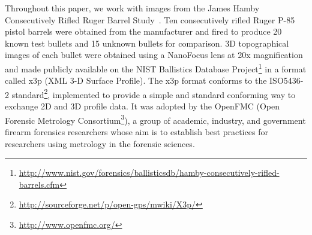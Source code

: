 \documentclass[aoas, preprint]{imsart}\usepackage[]{graphicx}\usepackage[]{color}
\begin{document}
Throughout this paper, we work with images from the James Hamby Consecutively Rifled Ruger Barrel Study~\citep{hamby:2009}. Ten consecutively rifled Ruger P-85 pistol barrels were obtained from the manufacturer and fired to produce 20 known test bullets and 15 unknown bullets for comparison. 
3D topographical images of each bullet were obtained using a NanoFocus lens at 20x magnification and made publicly available on the NIST Ballistics Database Project\footnote{\url{http://www.nist.gov/forensics/ballisticsdb/hamby-consecutively-rifled-barrels.cfm}} in a format called x3p (XML 3-D Surface Profile). The x3p format conforms to the ISO5436-2 standard\footnote{\url{http://sourceforge.net/p/open-gps/mwiki/X3p/}}, implemented to provide a simple and standard conforming way to exchange 2D and 3D profile data. It was adopted by the OpenFMC (Open Forensic Metrology Consortium\footnote{\url{http://www.openfmc.org/}}), a group of academic, industry, and government firearm forensics researchers whose aim is to establish best practices for researchers using metrology in the forensic sciences.
\end{document}
